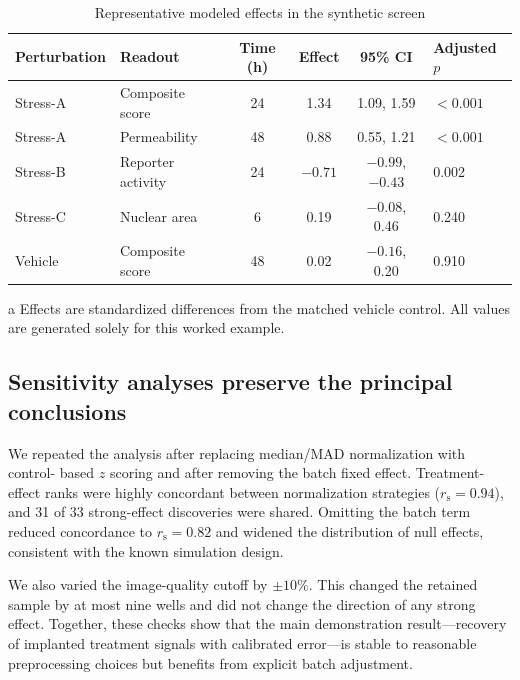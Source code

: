 \begin{table}[htbp]
\centering
\begin{threeparttable}
\caption{Representative modeled effects in the synthetic screen}
\label{tab:effects}
\begin{tabularx}{\textwidth}{@{}L{0.20\textwidth}L{0.18\textwidth}c c c Y@{}}
\toprule
Perturbation & Readout & Time (h) & Effect & 95\% CI & Adjusted $p$ \\
\midrule
Stress-A & Composite score & 24 & 1.34 & 1.09, 1.59 & $<0.001$ \\
Stress-A & Permeability & 48 & 0.88 & 0.55, 1.21 & $<0.001$ \\
Stress-B & Reporter activity & 24 & $-0.71$ & $-0.99$, $-0.43$ & 0.002 \\
Stress-C & Nuclear area & 6 & 0.19 & $-0.08$, 0.46 & 0.240 \\
Vehicle & Composite score & 48 & 0.02 & $-0.16$, 0.20 & 0.910 \\
\bottomrule
\end{tabularx}
\begin{tablenotes}[flushleft]
\footnotesize
\item[a] Effects are standardized differences from the matched vehicle control.
All values are generated solely for this worked example.
\end{tablenotes}
\end{threeparttable}
\end{table}

\subsection{Sensitivity analyses preserve the principal conclusions}
We repeated the analysis after replacing median/MAD normalization with control-
based $z$ scoring and after removing the batch fixed effect. Treatment-effect
ranks were highly concordant between normalization strategies
($r_{\mathrm{s}}=0.94$), and 31 of 33 strong-effect discoveries were shared.
Omitting the batch term reduced concordance to $r_{\mathrm{s}}=0.82$ and widened
the distribution of null effects, consistent with the known simulation design.

We also varied the image-quality cutoff by $\pm10\%$. This changed the retained
sample by at most nine wells and did not change the direction of any strong
effect. Together, these checks show that the main demonstration result---recovery
of implanted treatment signals with calibrated error---is stable to reasonable
preprocessing choices but benefits from explicit batch adjustment.
